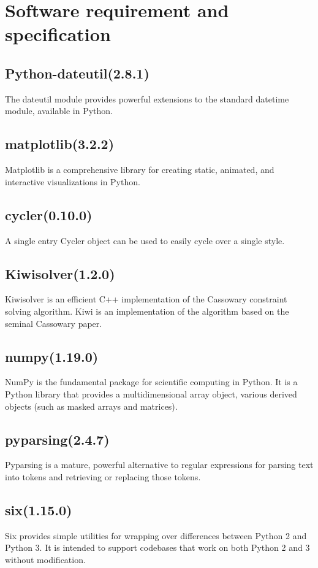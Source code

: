 \documentclass[11pt,a4paper]{report}
\begin{document}
	  \section*{Software requirement and specification}
		\vskip 1cm
		{\subsection*{Python-dateutil(2.8.1)}
		{The dateutil module provides powerful extensions to the standard datetime module, available in Python.}
		\vskip 1cm
		\subsection*{matplotlib(3.2.2)}
		{Matplotlib is a comprehensive library for creating static, animated, and interactive visualizations in Python.}
		\vskip 1cm
		\subsection*{cycler(0.10.0)}
		{A single entry Cycler object can be used to easily cycle over a single style.}
		\vskip 1cm
		\subsection*{Kiwisolver(1.2.0)}
		{Kiwisolver is an efficient C++ implementation of the Cassowary constraint solving algorithm. Kiwi is an implementation of the algorithm based on the seminal Cassowary paper.}
		\vskip 1cm
		\subsection*{numpy(1.19.0)}
		{NumPy is the fundamental package for scientific computing in Python. It is a Python library that provides a multidimensional array object, various derived objects (such as masked arrays and matrices).}
		\vskip 1cm
		\subsection*{pyparsing(2.4.7)}
		{Pyparsing is a mature, powerful alternative to regular expressions for parsing text into tokens and retrieving or replacing those tokens.}
		\vskip 1cm
		\subsection*{six(1.15.0)}
		{Six provides simple utilities for wrapping over differences between Python 2 and Python 3. It is intended to support codebases that work on both Python 2 and 3 without modification.}
		}
		\vskip 25cm
\end{document}
